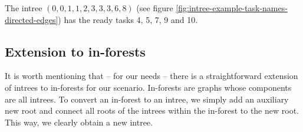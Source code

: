 The intree $(0,0,1,1,2,3,3,3,6,8)$ (see figure \ref{fig:intree-example-task-names-directed-edges}) has the ready tasks 4, 5, 7, 9 and 10.

\subsection{Extension to in-forests}
\label{sec:intrees-extension-to-forests}

It is worth mentioning that -- for our needs -- there is a straightforward extension of intrees to in-forests for our scenario. In-forests are graphs whose components are all intrees. To convert an in-forest to an intree, we simply add an auxiliary new root and connect all roots of the intrees within the in-forest to the new root. This way, we clearly obtain a new intree.

